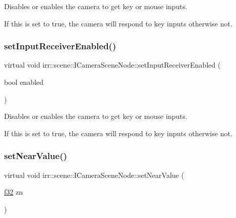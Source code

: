 Disables or enables the camera to get key or mouse inputs. 

If this is set to true, the camera will respond to key inputs otherwise not. \mbox{\label{classirr_1_1scene_1_1ICameraSceneNode_a5b5c89233c1805676d6fcb392236dfec}} 
\subsubsection{\texorpdfstring{set\+Input\+Receiver\+Enabled()}{setInputReceiverEnabled()}\hspace{0.1cm}{\footnotesize\ttfamily [2/2]}}
{\footnotesize\ttfamily virtual void irr\+::scene\+::\+I\+Camera\+Scene\+Node\+::set\+Input\+Receiver\+Enabled (\begin{DoxyParamCaption}\item[{bool}]{enabled }\end{DoxyParamCaption})\hspace{0.3cm}{\ttfamily [pure virtual]}}



Disables or enables the camera to get key or mouse inputs. 

If this is set to true, the camera will respond to key inputs otherwise not. \mbox{\label{classirr_1_1scene_1_1ICameraSceneNode_aab5107ae5d0373d6fb005a87741e7057}} 
\subsubsection{\texorpdfstring{set\+Near\+Value()}{setNearValue()}\hspace{0.1cm}{\footnotesize\ttfamily [1/2]}}
{\footnotesize\ttfamily virtual void irr\+::scene\+::\+I\+Camera\+Scene\+Node\+::set\+Near\+Value (\begin{DoxyParamCaption}\item[{\hyperlink{namespaceirr_a0277be98d67dc26ff93b1a6a1d086b07}{f32}}]{zn }\end{DoxyParamCaption})\hspace{0.3cm}{\ttfamily [pure virtual]}}



